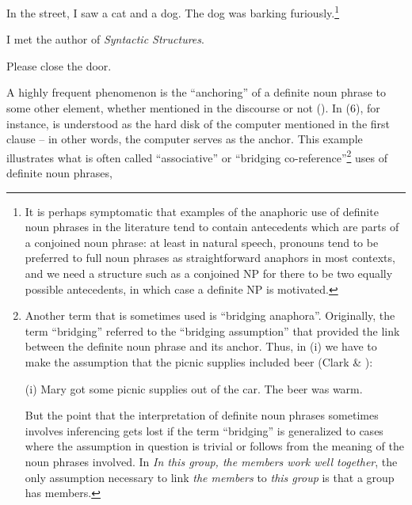\item 

\label{bkm:Ref93745057}In the street, I saw a cat and a dog. The dog was barking furiously.\footnote{ It is perhaps symptomatic that examples of the anaphoric use of definite noun phrases in the literature tend to contain antecedents which are parts of a conjoined noun phrase: at least in natural speech, pronouns tend to be preferred to full noun phrases as straightforward anaphors in most contexts, and we need a structure such as a conjoined NP for there to be two equally possible antecedents, in which case a definite NP is motivated.}


\item 

\label{bkm:Ref93745078}I met the author of \textit{Syntactic Structures}. 

\item 

\label{bkm:Ref93745091}Please close the door.



A highly frequent phenomenon is the “anchoring” of a definite noun phrase to some other element, whether mentioned in the discourse or not (\citet[25]{Fraurud1992}). In (6), for instance,  is understood as the hard disk of the computer mentioned in the first clause – in other words, the computer serves as the anchor.  This example illustrates what is often called “associative” or “bridging co-reference”\footnote{ Another term that is sometimes used is “bridging anaphora”. Originally, the term “bridging” referred to the “bridging assumption” that provided the link between the definite noun phrase and its anchor. Thus, in (i) we have to make the assumption that the picnic supplies included beer (Clark \& \citet{Haviland1974}):\par (i) Mary got some picnic supplies out of the car. The beer was warm. \par But the point that the interpretation of definite noun phrases sometimes involves inferencing gets lost if the term “bridging” is generalized to cases where the assumption in question is trivial or follows from the meaning of the noun phrases involved. In \textit{In this group, the members work well together}, the only assumption necessary to link \textit{the members} to \textit{this group} is that a group has members. } uses of definite noun phrases,

